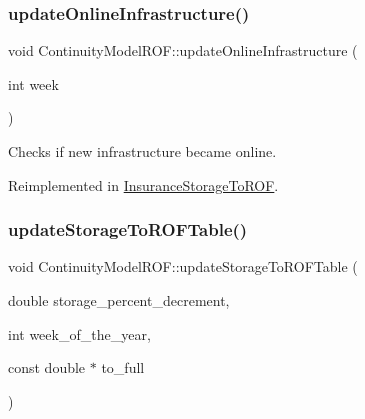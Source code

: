 \mbox{\label{classContinuityModelROF_af09f22c4fd69db45d3c8962713801287_af09f22c4fd69db45d3c8962713801287}} 
\subsubsection{\texorpdfstring{update\+Online\+Infrastructure()}{updateOnlineInfrastructure()}}
{\footnotesize\ttfamily void Continuity\+Model\+R\+O\+F\+::update\+Online\+Infrastructure (\begin{DoxyParamCaption}\item[{int}]{week }\end{DoxyParamCaption})\hspace{0.3cm}{\ttfamily [virtual]}}

Checks if new infrastructure became online. 

Reimplemented in \mbox{\hyperlink{classInsuranceStorageToROF_a5870934b8b33e1d872eca7b0940398ac_a5870934b8b33e1d872eca7b0940398ac}{Insurance\+Storage\+To\+R\+OF}}.

\mbox{\label{classContinuityModelROF_a28834584763c3aa27a6f0917aa68926f_a28834584763c3aa27a6f0917aa68926f}} 
\subsubsection{\texorpdfstring{update\+Storage\+To\+R\+O\+F\+Table()}{updateStorageToROFTable()}}
{\footnotesize\ttfamily void Continuity\+Model\+R\+O\+F\+::update\+Storage\+To\+R\+O\+F\+Table (\begin{DoxyParamCaption}\item[{double}]{storage\+\_\+percent\+\_\+decrement,  }\item[{int}]{week\+\_\+of\+\_\+the\+\_\+year,  }\item[{const double $\ast$}]{to\+\_\+full }\end{DoxyParamCaption})}


